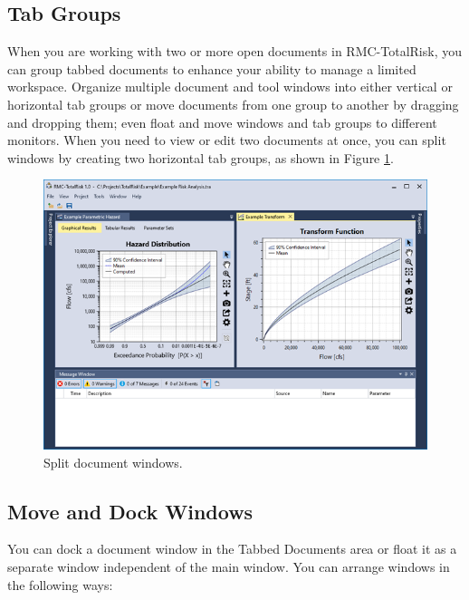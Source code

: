 \documentclass[
]{book}
\begin{document}
\hypertarget{tab-groups}{%
\subsection{Tab Groups}\label{tab-groups}}

When you are working with two or more open documents in RMC-TotalRisk, you can group tabbed documents to enhance your ability to manage a limited workspace. Organize multiple document and tool windows into either vertical or horizontal tab groups or move documents from one group to another by dragging and dropping them; even float and move windows and tab groups to different monitors. When you need to view or edit two documents at once, you can split windows by creating two horizontal tab groups, as shown in Figure \ref{fig:figure-20}.

\begin{figure}

{\centering \includegraphics{images/figure20} 

}

\caption{Split document windows.}\label{fig:figure-20}
\end{figure}

\hypertarget{move-and-dock-windows}{%
\subsection{Move and Dock Windows}\label{move-and-dock-windows}}

You can dock a document window in the Tabbed Documents area or float it as a separate window independent of the main window. You can arrange windows in the following ways:
\end{document}
